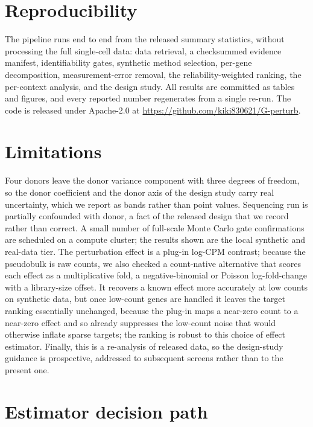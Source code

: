 \documentclass[11pt]{article}
\begin{document}
\section{Reproducibility}

The pipeline runs end to end from the released summary statistics, without
processing the full single-cell data: data retrieval, a checksummed evidence
manifest, identifiability gates, synthetic method selection, per-gene
decomposition, measurement-error removal, the reliability-weighted ranking, the
per-context analysis, and the design study. All results are committed as tables and figures, and every reported
number regenerates from a single re-run. The code is released under Apache-2.0 at
\url{https://github.com/kiki830621/G-perturb}.

\section{Limitations}

Four donors leave the donor variance component with three degrees of freedom, so
the donor coefficient and the donor axis of the design study carry real
uncertainty, which we report as bands rather than point values. Sequencing run is
partially confounded with donor, a fact of the released design that we record
rather than correct. A small number of full-scale Monte Carlo gate confirmations
are scheduled on a compute cluster; the results shown are the local synthetic and
real-data tier. The perturbation effect is a plug-in log-CPM contrast; because the
pseudobulk is raw counts, we also checked a count-native alternative that scores each
effect as a multiplicative fold, a negative-binomial or Poisson log-fold-change with a
library-size offset. It recovers a known effect more accurately at low counts on
synthetic data, but once low-count genes are handled it leaves the target ranking
essentially unchanged, because the plug-in maps a near-zero count to a near-zero
effect and so already suppresses the low-count noise that would otherwise inflate
sparse targets; the ranking is robust to this choice of effect estimator. Finally,
this is a re-analysis of released data, so the
design-study guidance is prospective, addressed to subsequent screens rather than
to the present one.

\appendix

\section{Estimator decision path}
\label{app:estimator}
\end{document}
